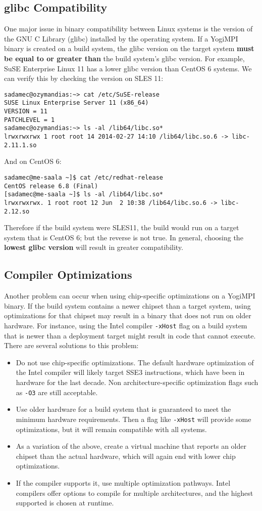 \documentclass{article}
\begin{document}
\subsection{glibc Compatibility}
One major issue in binary compatibility between Linux systems is the version of the GNU C Library (glibc) installed by the operating system. If a YogiMPI binary is created on a build system, the glibc version on the target system \textbf{must be equal to or greater than} the build system's glibc version.
For example, SuSE Enterprise Linux 11 has a lower glibc version than CentOS 6 systems. We can verify this by checking the version on SLES 11:
\begin{verbatim}
sadamec@ozymandias:~> cat /etc/SuSE-release 
SUSE Linux Enterprise Server 11 (x86_64)
VERSION = 11
PATCHLEVEL = 1
sadamec@ozymandias:~> ls -al /lib64/libc.so*
lrwxrwxrwx 1 root root 14 2014-02-27 14:10 /lib64/libc.so.6 -> libc-2.11.1.so
\end{verbatim}
And on CentOS 6:
\begin{verbatim}
sadamec@me-saala ~]$ cat /etc/redhat-release 
CentOS release 6.8 (Final)
[sadamec@me-saala ~]$ ls -al /lib64/libc.so*
lrwxrwxrwx. 1 root root 12 Jun  2 10:38 /lib64/libc.so.6 -> libc-2.12.so
\end{verbatim}
Therefore if the build system were SLES11, the build would run on a target system that is CentOS 6; but the reverse is not true. In general, choosing the \textbf{lowest glibc version} will result in greater compatibility.
\subsection{Compiler Optimizations}
Another problem can occur when using chip-specific optimizations on a YogiMPI binary.  If the build system contains a newer chipset than a target system, using optimizations for that chipset may result in a binary that does not run on older hardware.  For instance, using the Intel compiler \texttt{-xHost} flag on a build system that is newer than a deployment target might result in code that cannot execute. 
There are several solutions to this problem:
\begin{itemize}
\item Do not use chip-specific optimizations.  The default hardware optimization of the Intel compiler will likely target SSE3 instructions, which have been in hardware for the last decade. Non architecture-specific optimization flags such as \texttt{-O3} are still acceptable.
\item Use older hardware for a build system that is guaranteed to meet the minimum hardware requirements. Then a flag like \texttt{-xHost} will provide some optimizations, but it will remain compatible with all systems.
\item As a variation of the above, create a virtual machine that reports an older chipset than the actual hardware, which will again end with lower chip optimizations.
\item If the compiler supports it, use multiple optimization pathways. Intel compilers offer options to compile for multiple architectures, and the highest supported is chosen at runtime.
\end{itemize}
\end{document}
